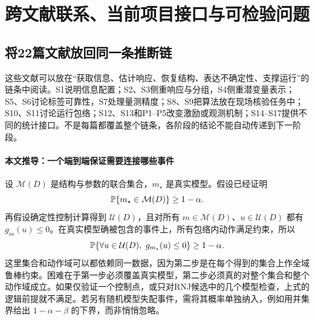 \section{跨文献联系、当前项目接口与可检验问题}
\subsection{将22篇文献放回同一条推断链}
这些文献可以放在“获取信息、估计响应、恢复结构、表达不确定性、支撑运行”的链条中阅读。S1说明信息配置；S2、S3侧重响应与分组，S4侧重潜变量表示；S5、S6讨论标签可靠性，S7处理量测精度；S8、S9把算法放在现场核验任务中；S10、S11讨论运行包络；S12、S13和P1--P5改变激励或观测机制；S14--S17提供不同的统计接口。不是每篇都覆盖整个链条，各阶段的结论不能自动传递到下一阶段。

\begin{center}
\end{center}

\paragraph{本文推导：一个端到端保证需要连接哪些事件}
设 $\mathcal M(D)$ 是结构与参数的联合集合，$m_\star$ 是真实模型。假设已经证明
\begin{equation}
 \mathbb{P}\{m_\star\in\mathcal M(D)\}\geq1-\alpha.
\end{equation}
再假设确定性控制计算得到 $\mathcal U(D)$，且对所有 $m\in\mathcal M(D)$、$u\in\mathcal U(D)$ 都有 $g_m(u)\leq0$。在真实模型确被包含的事件上，所有包络内动作满足约束，所以
\begin{equation}
 \Prob\{\forall u\in\mathcal U(D),\ g_{m_\star}(u)\leq0\}\geq1-\alpha.
 \label{eq:end-to-end}
\end{equation}
这里集合和动作域可以都依赖同一数据，因为第二步是在每个得到的集合上作全域鲁棒约束。困难在于第一步必须覆盖真实模型，第二步必须真的对整个集合和整个动作域成立。如果仅验证一个控制点，或只对RNJ候选中的几个模型检查，上式的逻辑前提就不满足。若另有随机模型失配事件，需将其概率单独纳入，例如用并集界给出 $1-\alpha-\beta$ 的下界，而非悄悄忽略。

